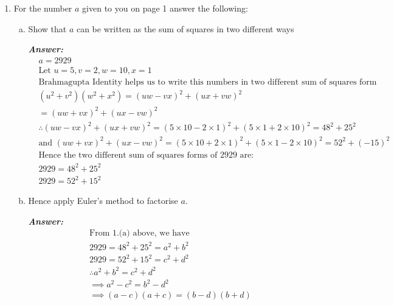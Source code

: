 \documentclass[11pt,a4paper,fleqn]{article}
\newcommand{\qed}{\tag*{$\blacksquare$}}
\begin{document}
	\begin{enumerate}[1.]
		\item For the number $a$ given to you on page 1 answer the following:
		\begin{enumerate}[a.]
			\item Show that $a$ can be written as the sum of squares in two different ways
			\bigskip
			\begin{flushleft}
				\textbf{\textit{Answer:}}
                \begin{align*}
                    &a = 2929 \\
                    &\text{Let } u = 5, v = 2, w = 10, x = 1\\
                    &\text{Brahmagupta Identity helps us to write this numbers in two different sum of squares form}\\
                    &(u^2 + v^2)(w^2 + x^2) = (uw - vx)^2 + (ux + vw)^2\\
                    &                       = (uw + vx)^2 + (ux - vw)^2\\
                    &\therefore (uw - vx)^2 + (ux + vw)^2 = (5 \times 10 - 2 \times 1)^2 + (5 \times 1 + 2\times 10)^2 = 48^2 + 25^2 \\
                    &\text{and }  (uw + vx)^2 + (ux - vw)^2 = (5 \times 10 + 2 \times 1)^2 + (5 \times 1 - 2 \times 10)^2 = 52^2 + (-15)^2\\
                    &\text{Hence the two different sum of squares forms of 2929 are: }\\
                    &2929 = 48^2 + 25^2\\
                    &2929 = 52^2 + 15^2
                    \qed
                \end{align*}
			\end{flushleft}
			\item Hence apply Euler’s method to factorise $a$.
			\begin{flushleft}
				\textbf{\textit{Answer:}}
                \begin{align*}
                    &\text{From 1.(a) above, we have }\\
                    &2929 = 48^2 + 25^2 = a^2 + b^2\\
                    &2929 = 52^2 + 15^2 = c^2 + d^2\\
                    &\therefore a^2 + b^2 = c^2 + d^2\\
                    &\implies a^2 - c^2 = b^2 - d^2\\
                    &\implies (a - c)(a + c) = (b - d)(b + d)\\

\end{align*}
\end{flushleft}
\end{enumerate}
\end{enumerate}
\end{document}
